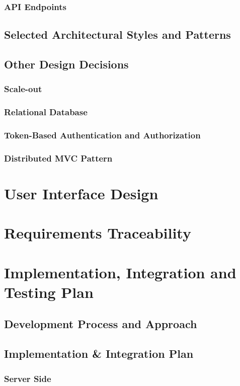 \documentclass[a4paper,12pt]{article}
\begin{document}
\subsubsection{API Endpoints}
\subsection{Selected Architectural Styles and Patterns}
\subsection{Other Design Decisions}
\subsubsection{Scale-out}
\subsubsection{Relational Database}
\subsubsection{Token-Based Authentication and Authorization}
\subsubsection{Distributed MVC Pattern}

\section{User Interface Design}

\section{Requirements Traceability}

\section{Implementation, Integration and Testing Plan}
\subsection{Development Process and Approach}
\subsection{Implementation \& Integration Plan}
\subsubsection{Server Side}
\end{document}

